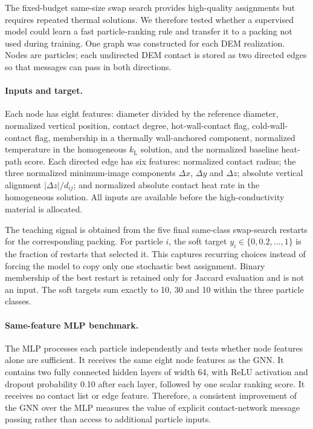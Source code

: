 \documentclass[12pt,a4paper]{article}
\begin{document}
	The fixed-budget same-size swap search provides high-quality assignments but requires repeated thermal
	solutions. We therefore tested whether a supervised model could learn a fast
	particle-ranking rule and transfer it to a packing not used during training. One
	graph was constructed for each DEM realization. Nodes are particles; each
	undirected DEM contact is stored as two directed edges so that messages can pass
	in both directions.

	\paragraph{Inputs and target.}
	Each node has eight features: diameter divided by the reference diameter,
	normalized vertical position, contact degree, hot-wall-contact flag,
	cold-wall-contact flag, membership in a thermally wall-anchored component,
	normalized temperature in the homogeneous $k_{\mathrm L}$ solution, and the
	normalized baseline heat-path score. Each directed edge has six features:
	normalized contact radius; the three normalized minimum-image components
	$\Delta x$, $\Delta y$ and $\Delta z$; absolute vertical alignment
	$|\Delta z|/d_{ij}$; and normalized absolute contact heat rate in the
	homogeneous solution. All inputs are available before the high-conductivity
	material is allocated.

	The teaching signal is obtained from the five final same-class swap-search
	restarts for the corresponding packing. For particle $i$, the soft target
	$y_i\in\{0,0.2,\ldots,1\}$ is the fraction of restarts that selected it. This
	captures recurring choices instead of forcing the model to copy only one
	stochastic best assignment. Binary membership of the best restart is retained
	only for Jaccard evaluation and is not an input. The soft targets sum exactly to
	10, 30 and 10 within the three particle classes.

	\paragraph{Same-feature MLP benchmark.}
	The MLP processes each particle independently and tests whether node features
	alone are sufficient. It receives the same eight node features as the GNN. It
	contains two fully connected hidden layers of width 64, with ReLU activation and
	dropout probability 0.10 after each layer, followed by one scalar ranking score.
	It receives no contact list or edge feature. Therefore, a consistent improvement
	of the GNN over the MLP measures the value of explicit contact-network message
	passing rather than access to additional particle inputs.
\end{document}
